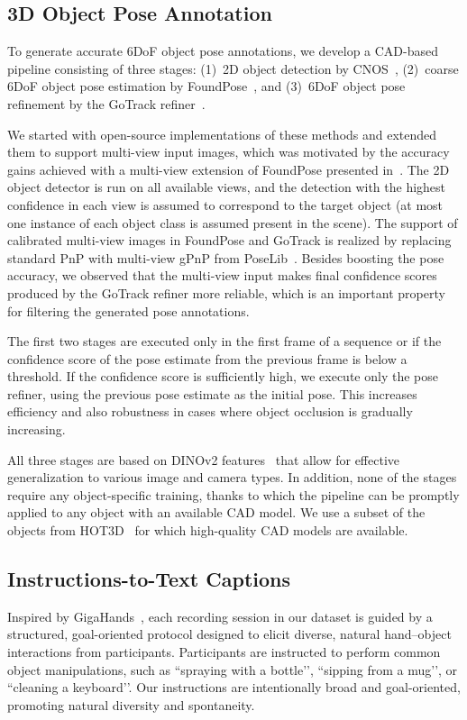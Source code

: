 \documentclass[10pt,twocolumn,letterpaper]{article}
\begin{document}
\subsection{3D Object Pose Annotation}
To generate accurate 6DoF object pose annotations, we develop a CAD-based pipeline consisting of three stages: (1)~2D object detection by CNOS~\cite{nguyen2023cnos}, (2)~coarse 6DoF object pose estimation by FoundPose~\cite{ornek2024foundpose}, and (3)~6DoF object pose refinement by the GoTrack refiner~\cite{nguyen2025gotrack}.

We started with open-source implementations of these methods and extended them to support multi-view input images, which was motivated by the accuracy gains achieved with a multi-view extension of FoundPose presented in~\cite{banerjee2025hot3d}. 
The 2D object detector is run on all available views, and the detection with the highest confidence in each view is assumed to correspond to the target object (at most one instance of each object class is assumed present in the scene). The support of calibrated multi-view images in FoundPose and GoTrack is realized by replacing standard PnP with multi-view gPnP from PoseLib~\cite{PoseLib}. Besides boosting the pose accuracy, we observed that the multi-view input makes final confidence scores produced by the GoTrack refiner more reliable, which is an important property for filtering the generated pose annotations.

The first two stages are executed only in the first frame of a sequence or if the confidence score of the pose estimate from the previous frame is below a threshold. If the confidence score is sufficiently high, we execute only the pose refiner, using the previous pose estimate as the initial pose. This increases efficiency and also robustness in cases where object occlusion is gradually increasing.

All three stages are based on DINOv2 features~\cite{oquab2023dinov2} that allow for effective generalization to various image and camera types. In addition, none of the stages require any object-specific training, thanks to which the pipeline can be promptly applied to any object with an available CAD model. We use a subset of the objects from HOT3D~\cite{banerjee2025hot3d} for which high-quality CAD models are available.


\subsection{Instructions-to-Text Captions}
Inspired by GigaHands~\cite{fu2025gigahands}, each recording session in our dataset is guided by a structured, goal-oriented protocol designed to elicit diverse, natural hand–object interactions from participants. 
Participants are instructed to perform common object manipulations, such as ``spraying with a bottle’’, ``sipping from a mug’’, or ``cleaning a keyboard’’. Our instructions are intentionally broad and goal-oriented, promoting natural diversity and spontaneity.
\end{document}
